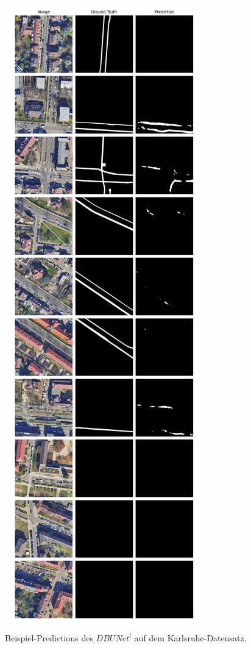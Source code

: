 \begin{figure}
	\centering
	\includegraphics[width=.41\textwidth]{Bilder/Samples-KA/dbunet-l.png} 
	\caption{Beispiel-Predictions des $DBUNet^l$ auf dem Karlsruhe-Datensatz.}
	\label{fig:ka-samples-dbunet-l}
\end{figure}

